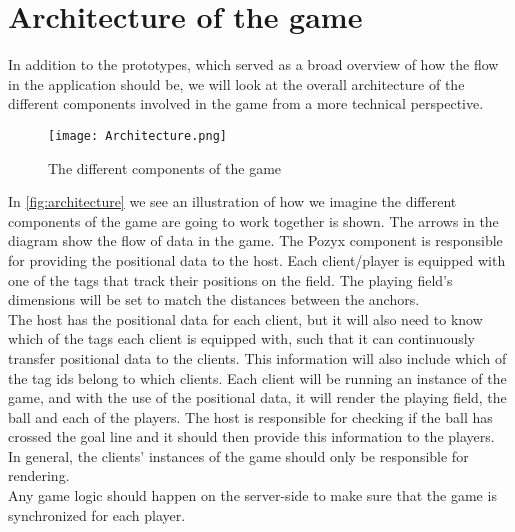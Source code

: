 \section{Architecture of the game}\label{sec:sprint1-architecture}
In addition to the prototypes, which served as a broad overview of how the flow in the application should be, we will look at the overall architecture of the different components involved in the game from a more technical perspective.
\begin{figure}[H]
    \centering
    \texttt{[image: Architecture.png]}
    \caption{The different components of the game}
    \label{fig:architecture}
\end{figure}
\noindent
In \autoref{fig:architecture} we see an illustration of how we imagine the different components of the game are going to work together is shown.
The arrows in the diagram show the flow of data in the game.
The Pozyx component is responsible for providing the positional data to the host.
Each client/player is equipped with one of the tags that track their positions on the field. 
The playing field's dimensions will be set to match the distances between the anchors. \\
The host has the positional data for each client, but it will also need to know which of the tags each client is equipped with, such that it can continuously transfer positional data to the clients.
This information will also include which of the tag ids belong to which clients.
Each client will be running an instance of the game, and with the use of the positional data, it will render the playing field, the ball and each of the players.
The host is responsible for checking if the ball has crossed the goal line and it should then provide this information to the players.
In general, the clients' instances of the game should only be responsible for rendering. \\
Any game logic should happen on the server-side to make sure that the game is synchronized for each player. 
